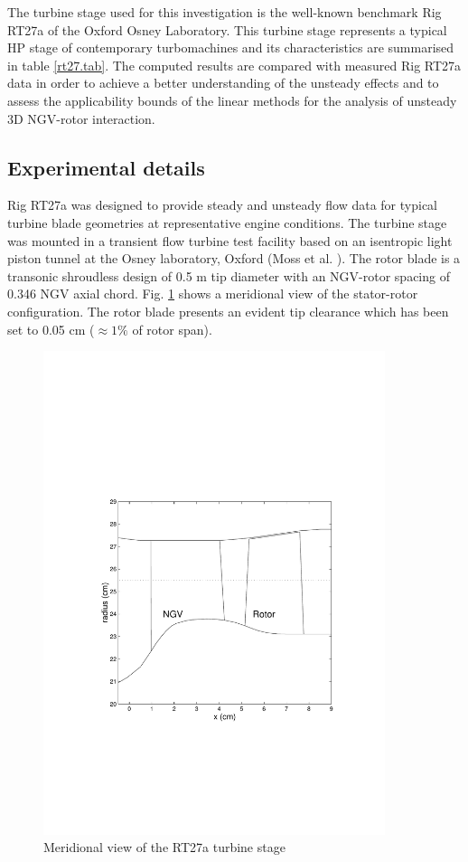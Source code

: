  The turbine stage used for this investigation is the well-known
 benchmark Rig RT27a of the Oxford Osney Laboratory. This
 turbine stage represents a typical HP stage of contemporary
 turbomachines and its characteristics are summarised in table \ref{rt27.tab}.
 The computed results are compared with measured Rig RT27a data
 in order to achieve a better understanding of the unsteady effects and
 to assess the applicability bounds of the linear methods for the
 analysis of unsteady 3D NGV-rotor interaction.
%
%
%
%
\subsection{Experimental details}
\label{rt27_experiment.subsec}
%
 Rig RT27a was designed to provide steady and unsteady flow data for typical
 turbine blade geometries at representative engine conditions.
 The turbine stage was mounted in a transient flow turbine test facility
 based on an isentropic light piston tunnel at the Osney laboratory, Oxford
 (Moss et al. ).
 The rotor blade is a transonic shroudless design of 0.5 m tip diameter with
 an NGV-rotor spacing of 0.346 NGV axial chord.
 Fig. \ref{stage1.fig} shows a meridional view of the stator-rotor
 configuration. The rotor blade presents an evident tip clearance
 which has been set to 0.05 cm ($\approx 1\%$ of rotor span).
%
%
\begin{figure}[ht]
   \centerline{\includegraphics[width=100mm,clip=t]{CHAP_RT27/FIGURE/stage1.pdf}}
   \caption{Meridional view of the RT27a turbine stage}
   \label{stage1.fig}
\end{figure}
